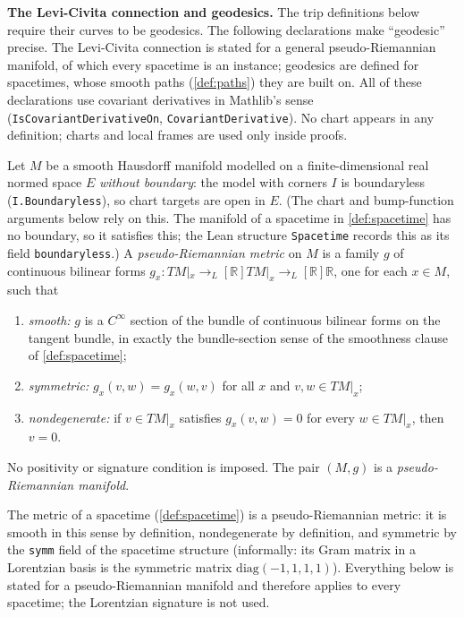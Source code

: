 \medskip
\noindent\textbf{The Levi-Civita connection and geodesics.} The trip definitions below require their curves to be geodesics. The following declarations make ``geodesic'' precise. The Levi-Civita connection is stated for a general pseudo-Riemannian manifold, of which every spacetime is an instance; geodesics are defined for spacetimes, whose smooth paths (\ref{def:paths}) they are built on. All of these declarations use covariant derivatives in Mathlib's sense (\texttt{IsCovariantDerivativeOn}, \texttt{CovariantDerivative}). No chart appears in any definition; charts and local frames are used only inside proofs.

\begin{definition}
    \label{def:pseudo-riemannian-metric}
    \leanok
    Let $M$ be a smooth Hausdorff manifold modelled on a finite-dimensional real normed space $E$ \emph{without boundary}: the model with corners $I$ is boundaryless (\texttt{I.Boundaryless}), so chart targets are open in $E$. (The chart and bump-function arguments below rely on this. The manifold of a spacetime in \ref{def:spacetime} has no boundary, so it satisfies this; the Lean structure \texttt{Spacetime} records this as its field \texttt{boundaryless}.) A \textit{pseudo-Riemannian metric} on $M$ is a family $g$ of continuous bilinear forms $g_x : TM|_x \to_L[\mathbb{R}] TM|_x \to_L[\mathbb{R}] \mathbb{R}$, one for each $x \in M$, such that
    \begin{enumerate}
        \item \emph{smooth:} $g$ is a $C^\infty$ section of the bundle of continuous bilinear forms on the tangent bundle, in exactly the bundle-section sense of the smoothness clause of \ref{def:spacetime};
        \item \emph{symmetric:} $g_x(v,w) = g_x(w,v)$ for all $x$ and $v, w \in TM|_x$;
        \item \emph{nondegenerate:} if $v \in TM|_x$ satisfies $g_x(v,w) = 0$ for every $w \in TM|_x$, then $v = 0$.
    \end{enumerate}
    No positivity or signature condition is imposed. The pair $(M,g)$ is a \textit{pseudo-Riemannian manifold}.

    The metric of a spacetime (\ref{def:spacetime}) is a pseudo-Riemannian metric: it is smooth in this sense by definition, nondegenerate by definition, and symmetric by the \texttt{symm} field of the spacetime structure (informally: its Gram matrix in a Lorentzian basis is the symmetric matrix $\mathrm{diag}(-1,1,1,1)$). Everything below is stated for a pseudo-Riemannian manifold and therefore applies to every spacetime; the Lorentzian signature is not used.
\end{definition}

